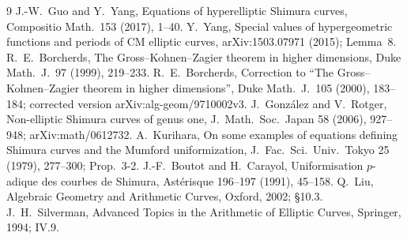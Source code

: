\documentclass[11pt,reqno]{amsart}
\theoremstyle{plain}
\theoremstyle{definition}
\begin{document}
\begin{thebibliography}{9}
 J.-W.~Guo and Y.~Yang, Equations of hyperelliptic Shimura curves, Compositio Math.\
153 (2017), 1–40.
 Y.~Yang, Special values of hypergeometric functions and periods of CM elliptic
curves, arXiv:1503.07971 (2015); Lemma~8.
 R.~E.~Borcherds, The Gross--Kohnen--Zagier theorem in higher dimensions, Duke Math.\ J.\
97 (1999), 219--233.
\bibitem{BoCorr} R.~E.~Borcherds, Correction to ``The Gross--Kohnen--Zagier theorem in higher
dimensions'', Duke Math.\ J.\ 105 (2000), 183--184; corrected version arXiv:alg-geom/9710002v3.
\bibitem{GR} J.~González and V.~Rotger, Non-elliptic Shimura curves of genus one, J.\ Math.\ Soc.\
Japan 58 (2006), 927--948; arXiv:math/0612732.
\bibitem{Ku} A.~Kurihara, On some examples of equations defining Shimura curves and the Mumford
uniformization, J.\ Fac.\ Sci.\ Univ.\ Tokyo 25 (1979), 277--300; Prop.~3-2.
\bibitem{BC} J.-F.~Boutot and H.~Carayol, Uniformisation $p$-adique des courbes de Shimura,
Astérisque 196--197 (1991), 45--158.
\bibitem{Liu} Q.~Liu, Algebraic Geometry and Arithmetic Curves, Oxford, 2002; \S10.3.
\bibitem{Si} J.~H.~Silverman, Advanced Topics in the Arithmetic of Elliptic Curves, Springer, 1994;
IV.9.
\end{thebibliography}
\end{document}
